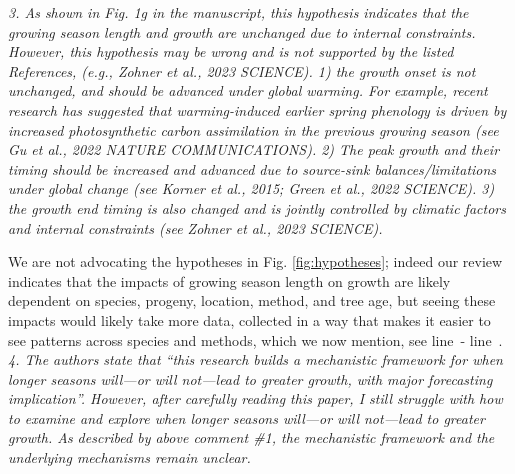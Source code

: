 \documentclass[11pt]{article}
\newcommand{\lr}[1]{line~\lineref{#1}}
\begin{document}

\emph{3. As shown in Fig. 1g in the manuscript, this hypothesis indicates that the growing season length and growth are unchanged due to internal constraints. However, this hypothesis may be wrong and is not supported by the listed References, (e.g., Zohner et al., 2023 SCIENCE). 1) the growth onset is not unchanged, and should be advanced under global warming. For example, recent research has suggested that warming-induced earlier spring phenology is driven by increased photosynthetic carbon assimilation in the previous growing season (see Gu et al., 2022 NATURE COMMUNICATIONS). 2) The peak growth and their timing should be increased and advanced due to source-sink balances/limitations under global change (see Korner et al., 2015; Green et al., 2022 SCIENCE). 3) the growth end timing is also changed and is jointly controlled by climatic factors and internal constraints (see Zohner et al., 2023 SCIENCE).}

We are not advocating the hypotheses in Fig. \ref{fig:hypotheses}; indeed our review indicates that the impacts of growing season length on growth are likely dependent on species, progeny, location, method, and tree age, but seeing these impacts would likely take more data, collected in a way that makes it easier to see patterns across species and methods, which we now mention, see  \lr{R2complaint3S}- \lr{R2complaint3E}.\\ %

\emph{4. The authors state that ``this research builds a mechanistic framework for when longer seasons will---or will not---lead to greater growth, with major forecasting implication''. However, after carefully reading this paper, I still struggle with how to examine and explore when longer seasons will---or will not---lead to greater growth. As described by above comment \#1, the mechanistic framework and the underlying mechanisms remain unclear.}
\end{document}

